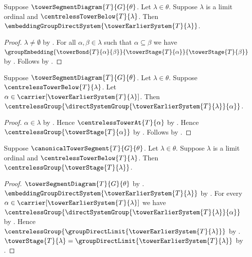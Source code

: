 \begin{theorem}\label{centreless_tower_earlier_system_embedding}
    Suppose $\towerSegmentDiagram{T}{G}{\theta}$.
    Let $\lambda\in\theta$.
    Suppose $\lambda$ is a limit ordinal and
        $\centrelessTowerBelow{T}{\lambda}$.
    Then $\embeddingGroupDirectSystem{
        \towerEarlierSystem{T}{\lambda}}$.
\end{theorem}
\begin{proof}
    $\lambda\neq\emptyset$ by .
    For all $\alpha,\beta\in\lambda$ such that
        $\alpha\subseteq\beta$ we have
        $\groupEmbedding
            {\towerBond{T}{\alpha}{\beta}}
            {\towerStage{T}{\alpha}}
            {\towerStage{T}{\beta}}$ by
        .
    Follows by .
\end{proof}

\begin{proposition}\label{centreless_tower_earlier_system_component}
    Suppose $\towerSegmentDiagram{T}{G}{\theta}$.
    Let $\lambda\in\theta$.
    Suppose $\centrelessTowerBelow{T}{\lambda}$.
    Let $\alpha\in
        \carrier[\towerEarlierSystem{T}{\lambda}]$.
    Then $\centrelessGroup{
        \directSystemGroup{\towerEarlierSystem{T}{\lambda}}{\alpha}}$.
\end{proposition}
\begin{proof}
    $\alpha\in\lambda$ by
        .
    Hence $\centrelessTowerAt{T}{\alpha}$ by
        .
    Hence $\centrelessGroup{\towerStage{T}{\alpha}}$ by
        .
    Follows by
        .
\end{proof}

\begin{proposition}\label{centreless_tower_limit_stage}
    Suppose $\canonicalTowerSegment{T}{G}{\theta}$.
    Let $\lambda\in\theta$.
    Suppose $\lambda$ is a limit ordinal and
        $\centrelessTowerBelow{T}{\lambda}$.
    Then $\centrelessGroup{\towerStage{T}{\lambda}}$.
\end{proposition}
\begin{proof}
    $\towerSegmentDiagram{T}{G}{\theta}$ by
        .
    $\embeddingGroupDirectSystem{
        \towerEarlierSystem{T}{\lambda}}$ by
        .
    For every $\alpha\in
        \carrier[\towerEarlierSystem{T}{\lambda}]$ we have
        $\centrelessGroup{
            \directSystemGroup{
                \towerEarlierSystem{T}{\lambda}}{\alpha}}$ by
        .
    Hence $\centrelessGroup{
        \groupDirectLimit{\towerEarlierSystem{T}{\lambda}}}$ by
        .
    $\towerStage{T}{\lambda}=
        \groupDirectLimit{\towerEarlierSystem{T}{\lambda}}$ by
        .
\end{proof}

